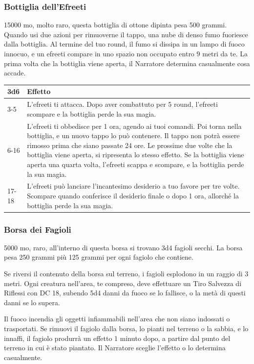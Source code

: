 \begin{multicols}{2}
	\subsubsection*{Bottiglia dell'Efreeti}
	15000 mo, molto raro, questa bottiglia di ottone dipinta pesa 500 grammi. Quando usi due azioni per rimuoverne il tappo, una nube di denso fumo fuoriesce dalla bottiglia. Al termine del tuo round, il fumo si dissipa in un lampo di fuoco innocuo, e un efreeti compare in uno spazio non occupato entro 9 metri da te. La prima volta che la bottiglia viene aperta, il Narratore determina casualmente cosa accade.

	\medskip

	\begin{tabularx}{0.45\textwidth}{lX}
		\textbf{3d6} &\textbf{Effetto}\\
		\hline
		3-5 & L'efreeti ti attacca. Dopo aver combattuto per 5 round, l'efreeti scompare e la bottiglia perde la sua magia.\\
		6-16 &L'efreeti ti obbedisce per 1 ora, agendo ai tuoi comandi. Poi torna nella bottiglia, e un nuovo tappo lo può contenere. Il tappo non potrà essere rimosso prima che siano passate 24 ore. Le prossime due volte che la bottiglia viene aperta, si ripresenta lo stesso effetto. Se la bottiglia viene aperta una quarta volta, l'efreeti scappa e scompare, e la bottiglia perde la sua magia.\\
		17-18 & L'efreeti può lanciare l'incantesimo desiderio a tuo favore per tre volte. Scompare quando conferisce il desiderio finale o dopo 1 ora, allorché la bottiglia perde la sua magia.
	\end{tabularx}


	\subsubsection*{Borsa dei Fagioli}
	5000 mo, raro, all'interno di questa borsa si trovano 3d4 fagioli secchi. La borsa pesa 250 grammi più 125 grammi per ogni fagiolo che contiene.

	Se riversi il contenuto della borsa sul terreno, i fagioli esplodono in un raggio di 3 metri. Ogni creatura nell'area, te compreso, deve effettuare un Tiro Salvezza di Riflessi con DC 18, subendo 5d4 danni da fuoco se lo fallisce, o la metà di questi danni se lo supera.

	Il fuoco incendia gli oggetti infiammabili nell'area che non siano indossati o trasportati. Se rimuovi il fagiolo dalla borsa, lo pianti nel terreno o la sabbia, e lo innaffi, il fagiolo produrrà un effetto 1 minuto dopo, a partire dal punto del terreno in cui è stato piantato. Il Narratore sceglie l'effetto o lo determina casualmente.

\end{multicols}


